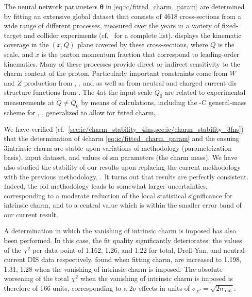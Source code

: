 The neural network parameters ${\boldsymbol \theta}$ in
\cref{eq:ic/fitted_charm_param} are determined by fitting an extensive global
dataset that consists of 4618  cross-sections from a wide range of different
processes, measured over the years in a variety of fixed-target and collider
experiments  (cf.\ \cite{Ball:2021leu} for a complete list).
%
 displays the kinematic coverage in the $(x,Q)$ plane
covered by these cross-sections, where $Q$ is the  scale, and  $x$ is the
parton momentum fraction that correspond to leading-order kinematics.
%
Many of these processes provide direct or indirect sensitivity  to the charm
content of the proton.
%
Particularly important constraints come from $W$ and $Z$ production from 
\atlas, \cms, and \lhcb as well as from neutral and charged current
\acrfull{dis} structure functions from \hera.
%
The 4\fns  \pdfs at the input scale $Q_0$ are related to experimental
measurements at $Q \not =Q_0$ by means of \nnlo \qcd calculations, including
the \fonll-C general-mass scheme for \dis, \cite{Forte:2010ta}, generalized to 
allow for fitted charm, \cite{Ball:2015tna}.

We have verified (cf.\
\cref{sec:ic/charm_stability_4fns,sec:ic/charm_stability_3fns}) that the
determination of 4\fns charm \pdf \cref{eq:ic/fitted_charm_param} and the
ensuing 3\fns intrinsic charm \pdf are  stable upon variations of methodology
(\pdf parametrization basis), input dataset, and values of \acrlong{sm}
parameters (the charm mass).
We have also studied the stability of our results upon replacing the current
\nnpdfr{4.0} methodology~\cite{Ball:2021leu} with the previous \nnpdfr{3.1}
methodology, \cite{NNPDF:2017mvq}. 
It turns out that results are  perfectly consistent.
Indeed, the old methodology leads to somewhat larger uncertainties,
corresponding to a moderate reduction of the local statistical significance for
intrinsic charm, and to a central value which is within the smaller  error band
of our current result.


A determination in which the vanishing of intrinsic charm is imposed has also
been performed.
%
In this case, the fit quality significantly deteriorates: the values of the
$\chi^2$ per data point of 1.162, 1.26, and 1.22 for total, Drell-Yan,  and
neutral-current DIS data respectively, found when fitting charm, are  increased
to 1.198, 1.31, 1.28 when the vanishing of intrinsic charm is imposed.
%
The absolute worsening of the total $\chi^2$ when the vanishing of intrinsic
charm is imposed is therefore of 166 units, corresponding to a $2\sigma$
effects in units of $\sigma_{\chi^2}= \sqrt{2n_\textrm{ dat}}$.

